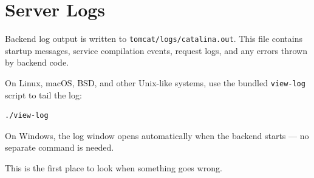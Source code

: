 \section{Server Logs}
\label{sec:setup-logs}

Backend log output is written to \texttt{tomcat/logs/catalina.out}.  This file contains startup messages, service compilation events, request logs, and any errors thrown by backend code.

On Linux, macOS, BSD, and other Unix-like systems, use the bundled \texttt{view-log} script to tail the log:

\begin{lstlisting}[style=shell]
./view-log
\end{lstlisting}

\noindent
On Windows, the log window opens automatically when the backend starts --- no separate command is needed.

This is the first place to look when something goes wrong.
